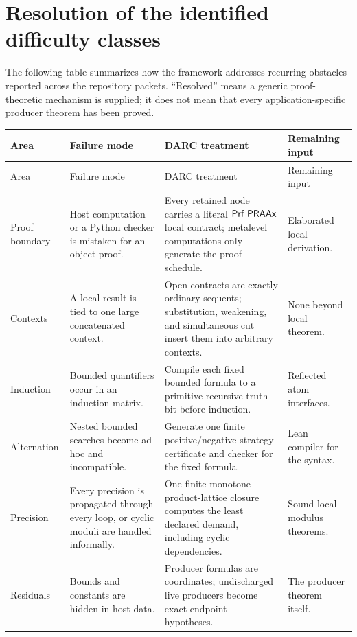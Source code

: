 \section{Resolution of the identified difficulty classes}
\label{sec:difficulties}

The following table summarizes how the framework addresses recurring obstacles
reported across the repository packets.  ``Resolved'' means a generic
proof-theoretic mechanism is supplied; it does not mean that every
application-specific producer theorem has been proved.

\small
\begin{longtable}{@{}p{}p{}p{}p{}@{}}
\toprule
Area & Failure mode & DARC treatment & Remaining input \\
\midrule
\endfirsthead
\toprule
Area & Failure mode & DARC treatment & Remaining input \\
\midrule
\endhead
Proof boundary & Host computation or a Python checker is mistaken for an
object proof. & Every retained node carries a literal
\(\mathsf{Prf}\;\mathsf{PRAAx}\) local contract; metalevel computations only generate the
proof schedule. & Elaborated local derivation. \\
\addlinespace
Contexts & A local result is tied to one large concatenated context. & Open
contracts are exactly ordinary sequents; substitution, weakening, and
simultaneous cut insert them into arbitrary contexts. & None beyond local
theorem. \\
\addlinespace
Induction & Bounded quantifiers occur in an induction matrix. & Compile each
fixed bounded formula to a primitive-recursive truth bit before induction. &
Reflected atom interfaces. \\
\addlinespace
Alternation & Nested bounded searches become ad hoc and incompatible. &
Generate one finite positive/negative strategy certificate and checker for the
fixed formula. & Lean compiler for the syntax. \\
\addlinespace
Precision & Every precision is propagated through every loop, or cyclic
moduli are handled informally. & One finite monotone product-lattice closure
computes the least declared demand, including cyclic dependencies. & Sound
local modulus theorems. \\
\addlinespace
Residuals & Bounds and constants are hidden in host data. & Producer formulas
are coordinates; undischarged live producers become exact endpoint
hypotheses. & The producer theorem itself. \\

\end{longtable}
